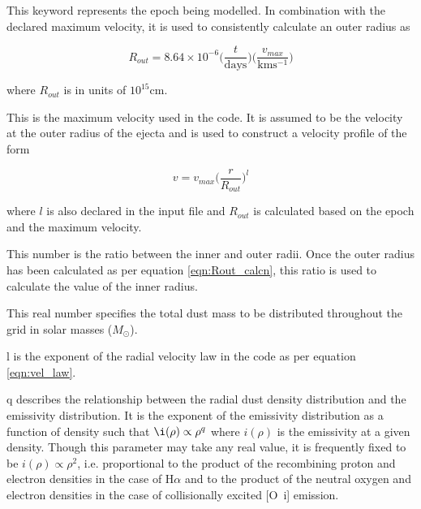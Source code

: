 
  This keyword represents the epoch being modelled.  In combination with the declared maximum velocity, it is used to consistently calculate an outer radius as 

\begin{equation}
R_{out}=8.64 \times 10^{-6} \Big( \frac{t}{\mathrm{days}} \Big) \Big( \frac{v_{max}}{\mathrm{kms^{-1}}} \Big)
\label{eqn:Rout_calcn}
\end{equation}

\noindent where $R_{out}$ is in units of $10^{15}$cm.


This is the maximum velocity used in the code.  It is assumed to be the velocity at the outer radius of the ejecta and is used to construct a velocity profile of the form

\begin{equation}
	v = v_{max} \Big( \frac{r}{R_{out}} \Big)^l
	\label{eqn:vel_law}
\end{equation}

where $l$ is also declared in the input file and $R_{out}$ is calculated based on the epoch and the maximum velocity.


This number is the ratio between the inner and outer radii.  Once the outer radius has been calculated as per equation \ref{eqn:Rout_calcn}, this ratio is used to calculate the value of the inner radius.


This real number specifies the total dust mass to be distributed throughout the grid in solar masses ($M_{\odot}$).


l is the exponent of the radial velocity law in the code as per equation \ref{eqn:vel_law}.


q describes the relationship between the radial dust density distribution and the emissivity distribution.  It is the exponent of the emissivity distribution as a function of density such that $\i(\rho) \propto \rho^q$ where $i(\rho)$ is the emissivity at a given density.  Though this parameter may take any real value, it is frequently fixed to be $i(\rho) \propto \rho^2$, i.e. proportional to the product of the recombining proton and electron densities in the case of H$\alpha$ and to the product of the neutral oxygen and electron densities in the case of collisionally excited [O~{\sc i}] emission.


